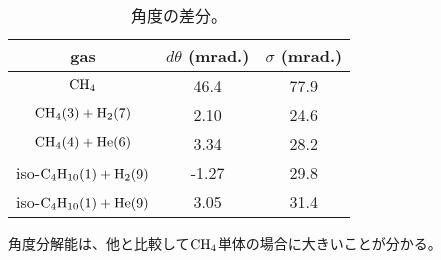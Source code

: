 \documentclass[../master]{subfiles}
\begin{document}
\begin{table}
  \centering
  \caption{角度の差分。}
  \label{tab::theta_resolution}
  \begin{tabular}{ccc}
    \toprule
    gas & $d\theta$ (mrad.) & $\sigma$ (mrad.) \\
    \midrule
    $\rm CH_{4}$ & 46.4 & 77.9 \\
    $\rm CH_{4} (3) + H_{2} (7)$ & 2.10 & 24.6 \\
    $\rm CH_{4} (4) + He (6)$ & 3.34 & 28.2 \\
    iso-$\rm C_{4}H_{10} (1) + H_{2} (9)$ & -1.27 & 29.8 \\
    iso-$\rm C_{4}H_{10} (1) + He (9) $ & 3.05 & 31.4 \\
    \midrule
  \end{tabular}
\end{table}
角度分解能は、他と比較して$\rm CH_{4}$単体の場合に大きいことが分かる。
\end{document}
